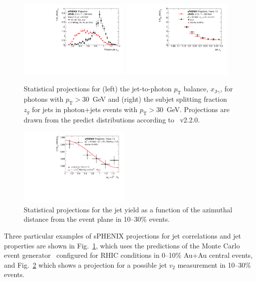 \begin{figure}[h]
\centering
\includegraphics[width=0.48\textwidth]{figs/xJg_1.pdf}
\includegraphics[width=0.48\textwidth]{figs/zg_1.pdf}
\caption{Statistical projections for (left) the jet-to-photon
  $p_\mathrm{T}$ balance, $x_\mathrm{J\gamma}$, for photons with
  $p_\mathrm{T} > 30$~GeV and (right) the subjet splitting fraction $z_g$
  for jets in photon+jets events with $p_\mathrm{T} >
  30$~GeV. Projections are drawn from the predict distributions
  according to \jewel~v2.2.0.}
\label{fig:jet_JEWEL_proj}
\end{figure}

\begin{figure}[h]
\centering
\includegraphics[width=0.48\textwidth]{figs/jet_dphi_1}
\caption{Statistical projections for the jet yield as a function of
  the azimuthal distance from the event plane in 10--30\% \auau
  events.}
\label{fig:jet_dphi_proj}
\end{figure}

Three particular examples of sPHENIX projections for jet correlations
and jet properties are shown in Fig.~\ref{fig:jet_JEWEL_proj}, which
uses the predictions of the \jewel Monte Carlo event
generator~\cite{KunnawalkamElayavalli:2016ttl} configured for RHIC
conditions in 0--10\% Au+Au central events, and
Fig.~\ref{fig:jet_dphi_proj} which shows a projection for a possible
jet $v_2$ measurement in 10--30\% \auau events.

